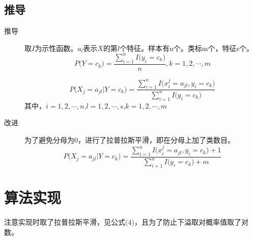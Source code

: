 \documentclass{ctexart}
\begin{document}
\subsection{推导}
\label{derivations}
\begin{description}
\item[推导]
取$I$为示性函数。$a_l$表示$X$的第$l$个特征。样本有n个。类标m个，特征s个。
\begin{equation}
P\big(Y=c_k\big)=\frac{\sum\limits_{i=1}^{n}I\big(y_i=c_k\big)}{n},k=1,2,\cdots,m
\end{equation}

\begin{equation}
P\big(X_j=a_{jl}|Y=c_k\big)=\frac{\sum\limits_{i=1}^{n}I\big(x_i^j=a_{jl},y_i=c_k\big)}{\sum\limits_{i=1}^{n}I\big(y_i=c_k\big)}
\end{equation}
其中，$i=1,2,\cdots,n$,$l=1,2,\cdots,s$,$k=1,2,\cdots,m$

\item[改进]
为了避免分母为0，进行了拉普拉斯平滑，即在分母上加了类数目。
\begin{equation}
P\big(X_j=a_{jl}|Y=c_k\big)=\frac{\sum\limits_{i=1}^{n}I\big(x_i^j=a_{jl},y_i=c_k\big)+1}{\sum\limits_{i=1}^{n}I\big(y_i=c_k\big)+m}
\end{equation}
\end{description}




\section{算法实现}
%
%
注意实现时取了拉普拉斯平滑，见公式$\big(4\big)$，且为了防止下溢取对概率值取了对数。
%
\end{document}
